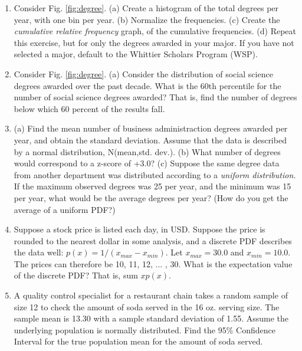 \documentclass{article}
\begin{document}
\begin{enumerate}
\item Consider Fig. \ref{fig:degree}.  (a) Create a histogram of the total degrees per year, with one bin per year. (b) Normalize the frequencies.  (c) Create the \textit{cumulative relative frequency} graph, of the cumulative frequencies.  (d) Repeat this exercise, but for only the degrees awarded in your major.  If you have not selected a major, default to the Whittier Scholars Program (WSP).  \\ \vspace{6cm}
\item Consider Fig. \ref{fig:degree}.  (a) Consider the distribution of social science degrees awarded over the past decade.  What is the 60th percentile for the number of social science degrees awarded?  That is, find the number of degrees below which 60 percent of the results fall. \\ \vspace{3cm}
\item (a) Find the mean number of business administraction degrees awarded per year, and obtain the standard deviation.  Assume that the data is described by a normal distribution, N(mean,std. dev.).  (b) What number of degrees would correspond to a z-score of +3.0? (c) Suppose the same degree data from another department was distributed according to a \textit{uniform distribution.}  If the maximum observed degrees was 25 per year, and the minimum was 15 per year, what would be the average degrees per year?  (How do you get the average of a uniform PDF?)  \\ \vspace{3cm}
\item Suppose a stock price is listed each day, in USD.  Suppose the price is rounded to the nearest dollar in some analysis, and a discrete PDF describes the data well: $p(x) = 1/(x_{max} - x_{min})$.  Let $x_{max} = 30.0$ and $x_{min} = 10.0$.  The prices can therefore be 10, 11, 12, ... , 30.  What is the expectation value of the discrete PDF?  That is, sum $x p(x)$.  \\ \vspace{3cm}
\item A quality control specialist for a restaurant chain takes a
random sample of size 12 to check the amount of soda served in the 16 oz. serving size. The sample mean is 13.30 with a
sample standard deviation of 1.55. Assume the underlying population is normally distributed.  Find the 95\% Confidence Interval for the true population mean for the amount of soda served.

\end{enumerate}
\end{document}

